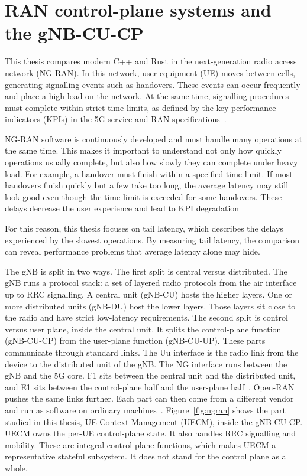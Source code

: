 \documentclass[english,oneside,a4paper,censored,csm,software-track-2020]{HYthesisML}
\begin{document}
\section{RAN control-plane systems and the gNB-CU-CP}\label{sec:ranarch}
This thesis compares modern C++ and Rust in the next-generation radio access network (NG-RAN).
In this network, user equipment (UE) moves between cells, generating signalling events such as
handovers. These events can occur frequently and place a high load on the network. At the same
time, signalling procedures must complete within strict time limits, as defined by the key
performance indicators (KPIs) in the 5G service and RAN specifications~\cite{3gpp38913,3gpp22261}.

NG-RAN software is continuously developed and must handle many operations at the same time.
This makes it important to understand not only how quickly operations usually complete, but also
how slowly they can complete under heavy load. For example, a handover must finish within a
specified time limit. If most handovers finish quickly but a few take too long, the average
latency may still look good even though the time limit is exceeded for some handovers. 
These delays decrease the user experience and lead to KPI degradation


For this reason, this thesis focuses on tail latency, which describes the delays experienced by
the slowest operations. By measuring tail latency, the comparison can reveal performance problems
that average latency alone may hide.

The gNB is split in two ways. The first split is central versus distributed.
The gNB runs a protocol stack: a set of layered radio protocols from the air
interface up to RRC signalling. A central unit (gNB-CU) hosts the higher layers.
One or more distributed units (gNB-DU) host the lower layers. Those layers sit close to
the radio and have strict low-latency requirements. The second split is control versus user
plane, inside the central unit. It splits the control-plane function
(gNB-CU-CP) from the user-plane function (gNB-CU-UP). These parts communicate through
standard links. The Uu interface is the radio link from the device to the
distributed unit of the gNB. The NG interface runs between the gNB and the 5G core.
F1 sits between the central unit and the distributed unit, and
E1 sits between the control-plane half and the user-plane
half~\cite{3gpp38401,3gpp38300,3gpp38463}.
Open-RAN pushes the same links further. Each part can then come from a
different vendor and run as software on ordinary
machines~\cite{polese2023oran}. Figure~\ref{fig:ngran} shows the part studied in this thesis, UE Context Management (UECM), inside the gNB-CU-CP. UECM owns the per-UE
control-plane state. It also handles RRC signalling and mobility. These are
integral control-plane functions, which makes UECM a representative stateful
subsystem. It does not stand for the control plane as a whole.
\end{document}
